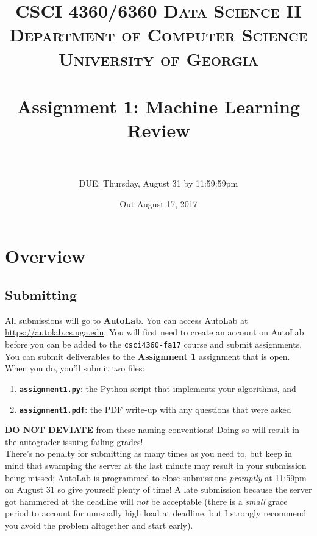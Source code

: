 \documentclass[paper=a4, fontsize=11pt]{scrartcl} %
\title{	
\normalfont \normalsize 
\textsc{CSCI 4360/6360 Data Science II} \\
\textsc{Department of Computer Science} \\
\textsc{University of Georgia} \\ [15pt] %
\horrule{0.5pt} \\[0.3cm] %
\huge Assignment 1: Machine Learning Review \\ %
\horrule{2pt} \\[0.4cm] %
}
\author{DUE: Thursday, August 31 by 11:59:59pm} %
\date{\normalsize Out August 17, 2017}
\numberwithin{equation}{section} %
\numberwithin{figure}{section} %
\numberwithin{table}{section} %
\begin{document}
\maketitle %


\section*{Overview}

\subsection{Submitting}

All submissions will go to \textbf{AutoLab}. You can access AutoLab at \url{https://autolab.cs.uga.edu}. You will first need to create an account on AutoLab before you can be added to the \texttt{csci4360-fa17} course and submit assignments. \\

You can submit deliverables to the \textbf{Assignment 1} assignment that is open. When you do, you'll submit two files:

\begin{enumerate}
	\item \texttt{\textbf{assignment1.py}}: the Python script that implements your algorithms, and
	\item \texttt{\textbf{assignment1.pdf}}: the PDF write-up with any questions that were asked
\end{enumerate}

\textbf{DO NOT DEVIATE} from these naming conventions! Doing so will result in the autograder issuing failing grades! \\

There's no penalty for submitting as many times as you need to, but keep in mind that swamping the server at the last minute may result in your submission being missed; AutoLab is programmed to close submissions \emph{promptly} at 11:59pm on August 31 so give yourself plenty of time! A late submission because the server got hammered at the deadline will \emph{not} be acceptable (there is a \emph{small} grace period to account for unusually high load at deadline, but I strongly recommend you avoid the problem altogether and start early). \\
\end{document}
